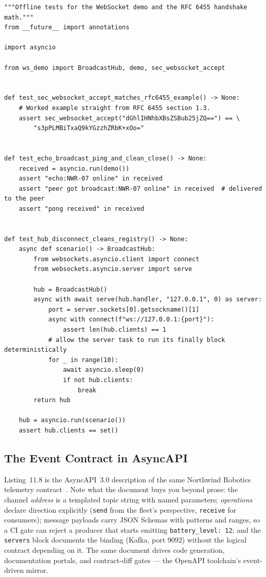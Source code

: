 \begin{verbatim}
"""Offline tests for the WebSocket demo and the RFC 6455 handshake math."""
from __future__ import annotations

import asyncio

from ws_demo import BroadcastHub, demo, sec_websocket_accept


def test_sec_websocket_accept_matches_rfc6455_example() -> None:
    # Worked example straight from RFC 6455 section 1.3.
    assert sec_websocket_accept("dGhlIHNhbXBsZSBub25jZQ==") == \
        "s3pPLMBiTxaQ9kYGzzhZRbK+xOo="


def test_echo_broadcast_ping_and_clean_close() -> None:
    received = asyncio.run(demo())
    assert "echo:NWR-07 online" in received
    assert "peer got broadcast:NWR-07 online" in received  # delivered to the peer
    assert "pong received" in received


def test_hub_disconnect_cleans_registry() -> None:
    async def scenario() -> BroadcastHub:
        from websockets.asyncio.client import connect
        from websockets.asyncio.server import serve

        hub = BroadcastHub()
        async with await serve(hub.handler, "127.0.0.1", 0) as server:
            port = server.sockets[0].getsockname()[1]
            async with connect(f"ws://127.0.0.1:{port}"):
                assert len(hub.clients) == 1
            # allow the server task to run its finally block deterministically
            for _ in range(10):
                await asyncio.sleep(0)
                if not hub.clients:
                    break
        return hub

    hub = asyncio.run(scenario())
    assert hub.clients == set()
\end{verbatim}

\subsection{The Event Contract in AsyncAPI}
\label{sec:ch11-code-asyncapi}

Listing~11.8 is the AsyncAPI~3.0 description of the same Northwind Robotics
telemetry contract~\cite{asyncapi}. Note what the document buys you beyond
prose: the channel \emph{address} is a templated topic string with named
parameters; \emph{operations} declare direction explicitly (\texttt{send}
from the fleet's perspective, \texttt{receive} for consumers); message
payloads carry JSON Schemas with patterns and ranges, so a CI gate can reject
a producer that starts emitting \texttt{battery\_level: 12}; and the
\texttt{servers} block documents the binding (Kafka, port 9092) without the
logical contract depending on it. The same document drives code generation,
documentation portals, and contract-diff gates --- the OpenAPI toolchain's
event-driven mirror.

